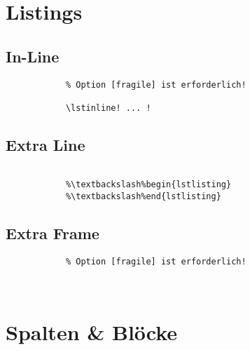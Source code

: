 \section{Listings}

	\subsection{In-Line}
	\begin{frame}[fragile]{\subsecname}

		\begin{lstlisting}
			% Option [fragile] ist erforderlich!

			\lstinline! ... !
		\end{lstlisting}

	\end{frame}

	\subsection{Extra Line}
	\begin{frame}[fragile]{\subsecname}

		\begin{lstlisting}[escapechar=\%]
			%\%% Option [fragile] ist erforderlich!

			%\textbackslash%begin{lstlisting}
			%\textbackslash%end{lstlisting}
		\end{lstlisting}

	\end{frame}

	\subsection{Extra Frame}
	\begin{frame}[fragile]{\subsecname}

		\begin{lstlisting}
			% Option [fragile] ist erforderlich!

			
		\end{lstlisting}

	\end{frame}

\section{Spalten \& Blöcke}

